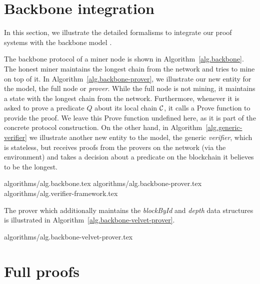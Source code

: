 \section{Backbone integration}
\label{sec.appendix-backbone}


In this section, we illustrate the detailed formalisms to integrate our proof
systems with the backbone model \cite{backbone}.

The backbone protocol of a miner node is shown in Algorithm~\ref{alg.backbone}.
The honest miner maintains the longest chain from the network and tries to mine
on top of it. In Algorithm~\ref{alg.backbone-prover}, we illustrate our new
entity for the model, the full node or \textit{prover}.  While the full node is
not mining, it maintains a state with the longest chain from the network.
Furthermore, whenever it is asked to prove a predicate $Q$ about its local
chain $\mathcal{C}$, it calls a Prove function to provide the proof.  We leave this
Prove function undefined here, as it is part of the concrete protocol
construction. On the other hand, in Algorithm~\ref{alg.generic-verifier} we
illustrate another new entity to the model, the generic \textit{verifier},
which is stateless, but receives proofs from the provers on the network (via
the environment) and takes a decision about a predicate on the blockchain it
believes to be the longest.

{algorithms/alg.backbone.tex}
{algorithms/alg.backbone-prover.tex}
{algorithms/alg.verifier-framework.tex}

The prover which additionally maintains the \textit{blockById} and
\textit{depth} data structures is illustrated in
Algorithm~\ref{alg.backbone-velvet-prover}.

{algorithms/alg.backbone-velvet-prover.tex}
\section{Full proofs}
\label{sec.proofs}

\restateThmSecurity*


